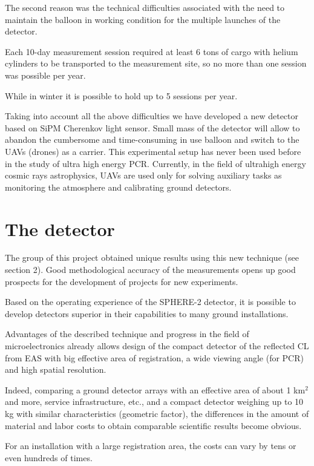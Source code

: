 \documentclass[a4paper,11pt]{article}
\begin{document}
The second reason was the technical difficulties associated with the need to maintain the balloon in working condition for the multiple launches of the detector.

Each 10-day measurement session required at least 6 tons of cargo with helium cylinders to be transported to the measurement site, so no more than one session was possible per year.

While in winter it is possible to hold up to 5 sessions per year.

Taking into account all the above difficulties we have developed a new detector based on SiPM Cherenkov light sensor.
Small mass of the detector will allow to abandon the cumbersome and time-consuming in use balloon and switch to the UAVs (drones) as a carrier.
This experimental setup has never been used before in the study of ultra high energy PCR.
Currently, in the field of ultrahigh energy cosmic rays astrophysics, UAVs are used only for solving auxiliary tasks as monitoring the atmosphere and calibrating ground detectors.


\section{The detector}

The group of this project obtained unique results using this new technique (see section 2). 
Good methodological accuracy of the measurements opens up good prospects for the development of projects for new experiments. 

Based on the operating experience of the SPHERE-2 detector, it is possible to develop detectors superior in their capabilities to many ground installations.

Advantages of the described technique and progress in the field of microelectronics already allows design of the compact detector of the reflected CL from EAS with big effective area of registration, a wide viewing angle (for PCR) and high spatial resolution. 

Indeed, comparing a ground detector arrays with an effective area of about 1 km$^2$ and more, service
infrastructure, etc., and a compact detector weighing up to 10 kg with similar characteristics (geometric factor), the differences in the amount of material and labor costs to obtain comparable scientific results become obvious. 

For an installation with a large registration area, the costs can vary by tens or even hundreds of times.
\end{document}
